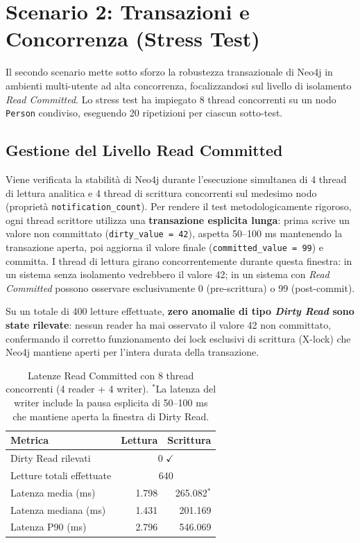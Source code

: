 \section{Scenario 2: Transazioni e Concorrenza (Stress Test)}
\label{sec:scenario2}
Il secondo scenario mette sotto sforzo la robustezza transazionale di Neo4j in ambienti multi-utente ad alta concorrenza, focalizzandosi sul livello di isolamento \textit{Read Committed}. Lo stress test ha impiegato 8 thread concorrenti su un nodo \texttt{Person} condiviso, eseguendo 20 ripetizioni per ciascun sotto-test.

\subsection{Gestione del Livello Read Committed}
Viene verificata la stabilità di Neo4j durante l'esecuzione simultanea di 4 thread di lettura analitica e 4 thread di scrittura concorrenti sul medesimo nodo (proprietà \texttt{notification\_count}). Per rendere il test metodologicamente rigoroso, ogni thread scrittore utilizza una \textbf{transazione esplicita lunga}: prima scrive un valore non committato (\texttt{dirty\_value = 42}), aspetta 50--100 ms mantenendo la transazione aperta, poi aggiorna il valore finale (\texttt{committed\_value = 99}) e committa. I thread di lettura girano concorrentemente durante questa finestra: in un sistema senza isolamento vedrebbero il valore 42; in un sistema con \textit{Read Committed} possono osservare esclusivamente 0 (pre-scrittura) o 99 (post-commit).

Su un totale di 400 letture effettuate, \textbf{zero anomalie di tipo \textit{Dirty Read} sono state rilevate}: nessun reader ha mai osservato il valore 42 non committato, confermando il corretto funzionamento dei lock esclusivi di scrittura (X-lock) che Neo4j mantiene aperti per l'intera durata della transazione.

\begin{table}[hbt!]
  \centering
  \begin{tabular}{lrr}
    \hline
    \textbf{Metrica} & \textbf{Lettura} & \textbf{Scrittura} \\
    \hline
    Dirty Read rilevati & \multicolumn{2}{c}{0 $\checkmark$} \\
    Letture totali effettuate & \multicolumn{2}{c}{640} \\
    Latenza media (ms) & 1.798 & 265.082$^{*}$ \\
    Latenza mediana (ms) & 1.431 & 201.169 \\
    Latenza P90 (ms) & 2.796 & 546.069 \\
    \hline
  \end{tabular}
  \caption{Latenze Read Committed con 8 thread concorrenti (4 reader + 4 writer). $^{*}$La latenza del writer include la pausa esplicita di 50--100 ms che mantiene aperta la finestra di Dirty Read.}
  \label{tab:read_committed}
\end{table}



